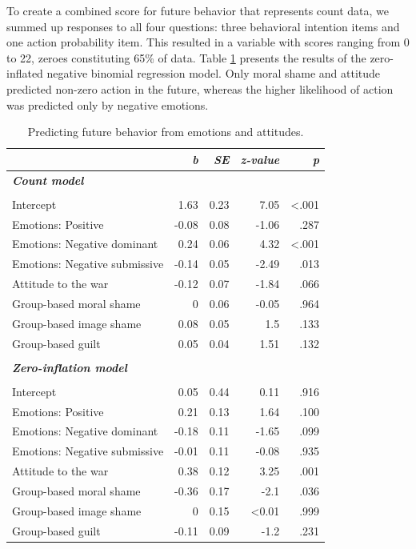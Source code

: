 \documentclass[
]{article}
\begin{document}
To create a combined score for future behavior that represents count data, we summed up responses to all four questions: three behavioral intention items and one action probability item. This resulted in a variable with scores ranging from 0 to 22, zeroes constituting 65\% of data. Table \ref{tab:TableS4} presents the results of the zero-inflated negative binomial regression model. Only moral shame and attitude predicted non-zero action in the future, whereas the higher likelihood of action was predicted only by negative emotions.

\begin{table}[H]
\centering
\caption{\label{tab:TableS4}Predicting future behavior from emotions and attitudes.}
\centering
\fontsize{8}{10}\selectfont
\begin{tabular}[t]{lrrrr}
\toprule
\em{ } & \em{b} & \em{SE} & \em{z-value} & \em{p}\\
\midrule
\em{\textbf{Count model}} & \em{\textbf{}} & \em{\textbf{}} & \em{\textbf{}} & \em{\textbf{}}\\
\midrule\\
Intercept & 1.63 & 0.23 & 7.05 & <.001\\
Emotions: Positive & -0.08 & 0.08 & -1.06 & .287\\
Emotions: Negative dominant & 0.24 & 0.06 & 4.32 & <.001\\
Emotions: Negative submissive & -0.14 & 0.05 & -2.49 & .013\\
\addlinespace
Attitude to the war & -0.12 & 0.07 & -1.84 & .066\\
Group-based moral shame & 0 & 0.06 & -0.05 & .964\\
Group-based image shame & 0.08 & 0.05 & 1.5 & .133\\
Group-based guilt & 0.05 & 0.04 & 1.51 & .132\\
\midrule\\
\em{\textbf{Zero-inflation model}} & \em{\textbf{}} & \em{\textbf{}} & \em{\textbf{}} & \em{\textbf{}}\\
\midrule\\
\addlinespace
Intercept & 0.05 & 0.44 & 0.11 & .916\\
Emotions: Positive & 0.21 & 0.13 & 1.64 & .100\\
Emotions: Negative dominant & -0.18 & 0.11 & -1.65 & .099\\
Emotions: Negative submissive & -0.01 & 0.11 & -0.08 & .935\\
Attitude to the war & 0.38 & 0.12 & 3.25 & .001\\
\addlinespace
Group-based moral shame & -0.36 & 0.17 & -2.1 & .036\\
Group-based image shame & 0 & 0.15 & <0.01 & .999\\
Group-based guilt & -0.11 & 0.09 & -1.2 & .231\\
\bottomrule
\end{tabular}
\end{table}
\end{document}
